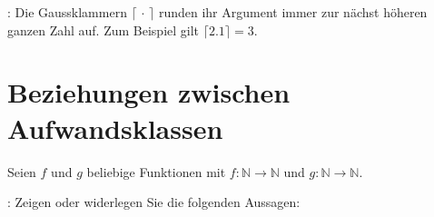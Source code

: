 \documentclass[german]{acAssignment}
\begin{document}
\vspace{0.4cm}

\acNote:
Die Gaussklammern $\lceil \,\cdot\, \rceil$ runden ihr Argument immer zur nächst höheren ganzen Zahl auf.
Zum Beispiel gilt $\lceil 2.1 \rceil = 3$.


\section{Beziehungen zwischen Aufwandsklassen}

Seien $f$ und $g$ beliebige Funktionen mit $f : \mathbb{N} \to \mathbb{N}$ und $g : \mathbb{N} \to \mathbb{N}$.

:
Zeigen oder widerlegen Sie die folgenden Aussagen:
\end{document}
